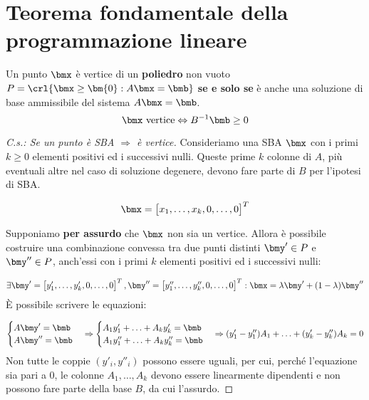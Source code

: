 \documentclass[\main/main.tex]{subfiles}
\begin{document}
\section{Teorema fondamentale della programmazione lineare}

\begin{theorem}
  Un punto $\bmx$ è vertice di un \textbf{poliedro} non vuoto $P=\crl{\bmx \geq \bm{0} : A\bmx = \bmb}$ \textbf{se e solo se} è anche una soluzione di base ammissibile del sistema $A\bmx = \bmb$.
  \[
    \bmx \text{ vertice} \Leftrightarrow B^{-1}\bmb\geq 0
  \]
\end{theorem}

\begin{proof}[C.s.: Se un punto è SBA $\Rightarrow$ è vertice]
  Consideriamo una SBA $\bmx$ con i primi $k \geq 0$ elementi positivi ed i successivi nulli. Queste prime $k$ colonne di $A$, più eventuali altre nel caso di soluzione degenere, devono fare parte di $B$ per l'ipotesi di SBA.

  \[
    \bmx = \begin{bmatrix}
      x_1, \ldots, x_k, 0, \ldots, 0
    \end{bmatrix}^T
  \]

  Supponiamo \textbf{per assurdo} che $\bmx$ non sia un vertice. Allora è possibile costruire una combinazione convessa tra due punti distinti $\bmy' \in P$ e $\bmy'' \in P$, anch'essi con i primi $k$ elementi positivi ed i successivi nulli:

  \[
    \exists \bmy' = \begin{bmatrix}
      y'_1, \ldots, y'_k, 0, \ldots, 0
    \end{bmatrix}^T,
    \bmy'' = \begin{bmatrix}
      y''_1, \ldots, y''_k, 0, \ldots, 0
    \end{bmatrix}^T:
    \bmx = \lambda \bmy' + (1-\lambda)\bmy''
  \]
  È possibile scrivere le equazioni:

  \[
    \begin{cases}
      A\bmy' = \bmb  \\
      A\bmy'' = \bmb \\
    \end{cases}
    \Rightarrow
    \begin{cases}
      A_1y'_1 + \ldots + A_ky'_k = \bmb   \\
      A_1y''_1 + \ldots + A_ky''_k = \bmb \\
    \end{cases}
    \Rightarrow
    (y'_1 - y''_1)A_1 + \ldots + (y'_k -y''_k)A_k = 0
  \]
  Non tutte le coppie $(y'_i, y''_i)$ possono essere uguali, per cui, perché l'equazione sia pari a $0$, le colonne $A_1, \ldots, A_k$ devono essere linearmente dipendenti e non possono fare parte della base $B$, da cui l'assurdo.
\end{proof}
\end{document}
